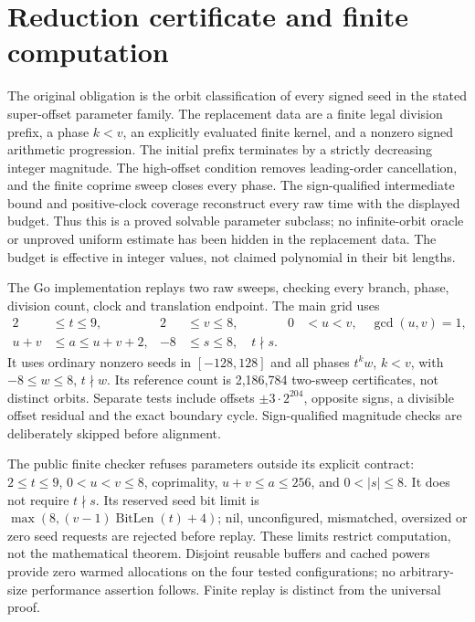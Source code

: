\documentclass[11pt,letterpaper]{article}
\begin{document}
\section{Reduction certificate and finite computation}

The original obligation is the orbit classification of every signed seed in
the stated super-offset parameter family. The replacement data are a finite
legal division prefix, a phase \(k<v\), an explicitly evaluated finite kernel,
and a nonzero signed arithmetic progression. The initial prefix terminates
by a strictly decreasing integer magnitude. The high-offset condition removes
leading-order cancellation, and the finite coprime sweep closes every phase.
The sign-qualified intermediate bound and positive-clock coverage reconstruct
every raw time with the displayed budget. Thus this is a proved solvable
parameter subclass; no infinite-orbit oracle or unproved uniform estimate
has been hidden in the replacement data. The budget is effective in integer
values, not claimed polynomial in their bit lengths.

The Go implementation replays two raw sweeps, checking every branch, phase,
division count, clock and translation endpoint. The main grid uses
\[
\begin{aligned}
2&\le t\le9,&2&\le v\le8,&0&<u<v,\quad\gcd(u,v)=1,\\
u+v&\le a\le u+v+2,&-8&\le s\le8,\quad t\nmid s.
\end{aligned}
\]
It uses ordinary nonzero seeds in \([-128,128]\) and all phases \(t^k w\),
\(k<v\), with \(-8\le w\le8\), \(t\nmid w\). Its reference count is
2,186,784 two-sweep certificates, not distinct orbits.
Separate tests include offsets \(\pm3\cdot2^{204}\), opposite signs,
a divisible offset residual and the exact boundary cycle.
Sign-qualified magnitude checks are deliberately skipped before alignment.

The public finite checker refuses parameters outside its explicit contract:
\(2\le t\le9\), \(0<u<v\le8\), coprimality,
\(u+v\le a\le256\), and \(0<|s|\le8\).
It does not require \(t\nmid s\).
Its reserved seed bit limit is
\(\max(8,(v-1)\operatorname{BitLen}(t)+4)\);
nil, unconfigured, mismatched, oversized or zero seed requests are rejected
before replay. These limits restrict computation, not the mathematical
theorem. Disjoint reusable buffers and cached powers provide zero warmed
allocations on the four tested configurations; no arbitrary-size performance
assertion follows. Finite replay is distinct from the universal proof.
\end{document}
